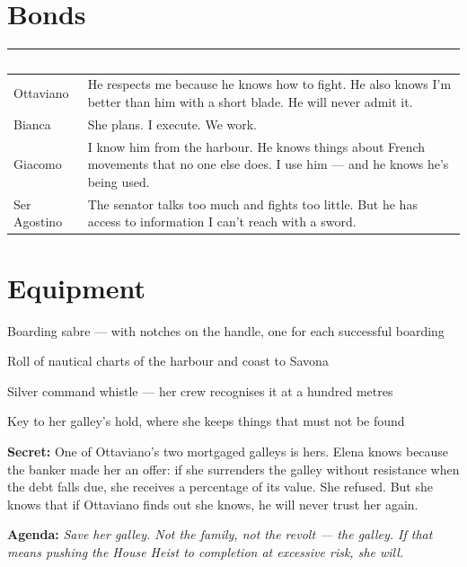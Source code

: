 \section*{Bonds}
\begin{table}[h]\centering\renewcommand{\arraystretch}{1.4}
\begin{tabularx}{\linewidth}{@{}L{2.4cm} X@{}}
\toprule{}
\textcolor{white}{\textbf{PC}} & \textcolor{white}{\textbf{Bond}} \\
\midrule
Ottaviano & He respects me because he knows how to fight. He also knows I'm better than him with a short blade. He will never admit it. \\
Bianca & She plans. I execute. We work. \\
Giacomo & I know him from the harbour. He knows things about French movements that no one else does. I use him --- and he knows he's being used. \\
Ser Agostino & The senator talks too much and fights too little. But he has access to information I can't reach with a sword. \\
\bottomrule
\end{tabularx}
\end{table}

\section*{Equipment}
\begin{goldlist}
\item Boarding sabre --- with notches on the handle, one for each successful boarding
\item Roll of nautical charts of the harbour and coast to Savona
\item Silver command whistle --- her crew recognises it at a hundred metres
\item Key to her galley's hold, where she keeps things that must not be found
\end{goldlist}

\clearpage
\begin{secretbox}
\textbf{Secret:} One of Ottaviano's two mortgaged galleys is hers. Elena knows because
the banker made her an offer: if she surrenders the galley without resistance when the
debt falls due, she receives a percentage of its value. She refused. But she knows that
if Ottaviano finds out she knows, he will never trust her again.

\medskip\noindent\textcolor{SecretRed}{\textbf{Agenda:}}
\textit{Save her galley. Not the family, not the revolt --- the galley. If that means
pushing the House Heist to completion at excessive risk, she will.}
\end{secretbox}

